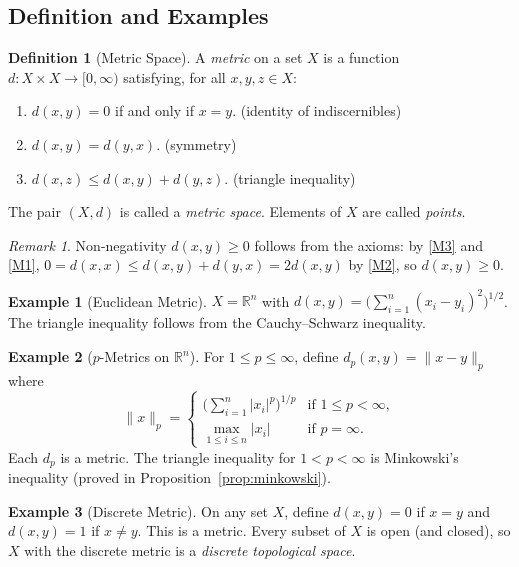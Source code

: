 \documentclass[11pt,a4paper]{article}
\theoremstyle{definition}
\newtheorem{definition}{Definition}[section]
\newtheorem{example}{Example}[section]
\theoremstyle{plain}
\theoremstyle{remark}
\newtheorem{remark}{Remark}[section]
\newcommand{\R}{\mathbb{R}}
\begin{document}
\subsection{Definition and Examples}
\label{subsec:metric_def}

\begin{definition}[Metric Space]
\label{def:metric}
A \emph{metric} on a set $X$ is a function $d \colon X \times X \to [0,\infty)$
satisfying, for all $x, y, z \in X$:
\begin{enumerate}[nosep,label=(M\arabic*)]
    \item \label{M1} $d(x,y) = 0$ if and only if $x = y$.
    \hfill(identity of indiscernibles)
    \item \label{M2} $d(x,y) = d(y,x)$.
    \hfill(symmetry)
    \item \label{M3} $d(x,z) \le d(x,y) + d(y,z)$.
    \hfill(triangle inequality)
\end{enumerate}
The pair $(X,d)$ is called a \emph{metric space}. Elements of $X$ are called
\emph{points}.
\end{definition}

\begin{remark}
Non-negativity $d(x,y) \ge 0$ follows from the axioms: by \ref{M3} and \ref{M1},
$0 = d(x,x) \le d(x,y) + d(y,x) = 2d(x,y)$ by \ref{M2}, so $d(x,y) \ge 0$.
\end{remark}

\begin{example}[Euclidean Metric]
\label{ex:euclidean}
$X = \R^n$ with $d(x,y) = \bigl(\sum_{i=1}^n (x_i - y_i)^2\bigr)^{1/2}$. The
triangle inequality follows from the Cauchy--Schwarz inequality.
\end{example}

\begin{example}[$p$-Metrics on $\R^n$]
\label{ex:p_metric}
For $1 \le p \le \infty$, define $d_p(x,y) = \|x - y\|_p$ where
\[
\|x\|_p =
\begin{cases}
\bigl(\sum_{i=1}^n |x_i|^p\bigr)^{1/p} & \text{if } 1 \le p < \infty,\\
\max_{1 \le i \le n} |x_i| & \text{if } p = \infty.
\end{cases}
\]
Each $d_p$ is a metric. The triangle inequality for $1 < p < \infty$ is
Minkowski's inequality (proved in Proposition~\ref{prop:minkowski}).
\end{example}

\begin{example}[Discrete Metric]
\label{ex:discrete}
On any set $X$, define $d(x,y) = 0$ if $x = y$ and $d(x,y) = 1$ if $x \ne y$.
This is a metric. Every subset of $X$ is open (and closed), so $X$ with the
discrete metric is a \emph{discrete topological space}.
\end{example}
\end{document}
